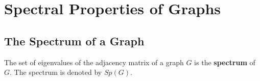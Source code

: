 

\setcounter{section}{10}
\section{Spectral Properties of Graphs}

\setcounter{subsection}{1}
\subsection{The Spectrum of a Graph}
\begin{definition}
	The set of eigenvalues of the adjacency matrix of a graph $G$ is the \textbf{spectrum} of $G$. The spectrum is denoted by $Sp(G)$.
\end{definition}

